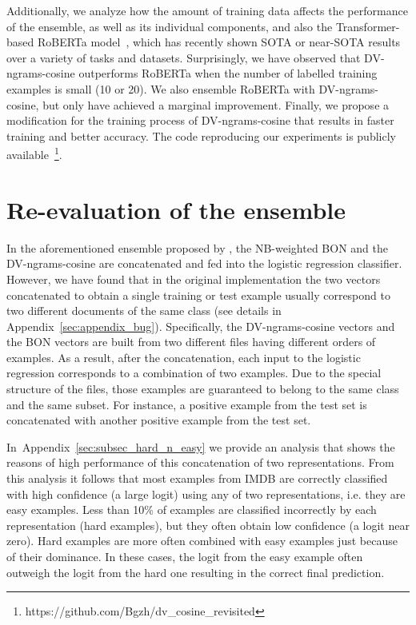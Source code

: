 \documentclass[11pt]{article}
\begin{document}
Additionally, we analyze how the amount of training data affects the performance of the ensemble, as well as its individual components, and also the Transformer-based RoBERTa model~\cite{liu2020roberta}, which has recently shown SOTA or near-SOTA results over a variety of tasks and datasets. Surprisingly, we have observed that DV-ngrams-cosine outperforms RoBERTa when the number of labelled training examples is small (10 or 20). We also ensemble RoBERTa with DV-ngrams-cosine, but only have achieved a marginal improvement. Finally, we propose a modification for the training process of DV-ngrams-cosine that results in faster training and better accuracy. The code reproducing our experiments is publicly available~\footnote{https://github.com/Bgzh/dv\_cosine\_revisited}.

\section{Re-evaluation of the ensemble}
\label{sec:ens_n_problem}
In the aforementioned ensemble proposed by \citet{thongtan-phienthrakul-2019-sentiment}, the NB-weighted BON and the DV-ngrams-cosine are concatenated and fed into the logistic regression classifier. 
However, we have found that in the original implementation the two vectors concatenated to obtain a single training or test example usually correspond to two different documents of the same class (see details in Appendix~\ref{sec:appendix_bug}). Specifically, the DV-ngrams-cosine vectors and the BON vectors are built from two different files having different orders of examples. As a result, after the concatenation, each input to the logistic regression corresponds to a combination of two examples. Due to the special structure of the files, those examples are guaranteed to belong to the same class and the same subset. For instance, a positive example from the test set is concatenated with another positive example from the test set. 

In~Appendix~\ref{sec:subsec_hard_n_easy} we provide an analysis that shows the reasons of high performance of this concatenation of two representations. From this analysis it follows that most examples from IMDB are correctly classified with high confidence (a large logit) using any of two representations, i.e. they are easy examples. Less than 10\% of examples are classified incorrectly by each representation (hard examples), but they often obtain low confidence (a logit near zero). Hard examples are more often combined with  easy examples just because of their dominance. In these cases, the logit from the easy example often outweigh the logit from the hard one resulting in the correct final prediction.
\end{document}
